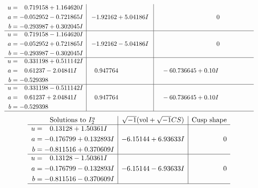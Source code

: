 \documentclass[1p]{elsarticle_modified}
\theoremstyle{definition}
\newcommand{\I}{\sqrt{-1}}
\begin{document}
$$\begin{array}{c|c|c}
\begin{aligned}
u &= \phantom{-}0.719158 + 1.164620 I \\
a &= -0.052952 - 0.721865 I \\
b &= -0.293987 + 0.302045 I\end{aligned}
 & -1.92162 + 5.04186 I & \phantom{-0.000000 } 0 \\ \hline\begin{aligned}
u &= \phantom{-}0.719158 - 1.164620 I \\
a &= -0.052952 + 0.721865 I \\
b &= -0.293987 - 0.302045 I\end{aligned}
 & -1.92162 - 5.04186 I & \phantom{-0.000000 } 0 \\ \hline\begin{aligned}
u &= \phantom{-}0.331198 + 0.511142 I \\
a &= \phantom{-}0.61237 - 2.04841 I \\
b &= -0.529398\phantom{ +0.000000I}\end{aligned}
 & \phantom{-}0.947764\phantom{ +0.000000I} & \phantom{-}                -6
0.736645 + 0. 10   I\phantom{ +0.000000I} \\ \hline\begin{aligned}
u &= \phantom{-}0.331198 - 0.511142 I \\
a &= \phantom{-}0.61237 + 2.04841 I \\
b &= -0.529398\phantom{ +0.000000I}\end{aligned}
 & \phantom{-}0.947764\phantom{ +0.000000I} & \phantom{-}                -6
0.736645 + 0. 10   I\phantom{ +0.000000I}\\
 \hline 
 \end{array}$$\newpage$$\begin{array}{c|c|c}  
\text{Solutions to }I^u_{2}& \I (\text{vol} + \sqrt{-1}CS) & \text{Cusp shape}\\
 \hline 
\begin{aligned}
u &= \phantom{-}0.13128 + 1.50361 I \\
a &= -0.176799 + 0.132893 I \\
b &= -0.811516 + 0.370609 I\end{aligned}
 & -6.15144 + 6.93633 I & \phantom{-0.000000 } 0 \\ \hline\begin{aligned}
u &= \phantom{-}0.13128 - 1.50361 I \\
a &= -0.176799 - 0.132893 I \\
b &= -0.811516 - 0.370609 I\end{aligned}
 & -6.15144 - 6.93633 I & \phantom{-0.000000 } 0\\
 \hline 
 \end{array}$$\newpage\newpage\renewcommand{\arraystretch}{1}
\end{document}
